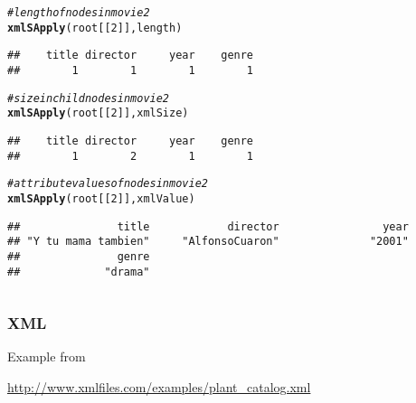 \documentclass[12pt]{beamer}\usepackage[]{graphicx}\usepackage[]{color}
\makeatletter
\newcommand{\hlnum}[1]{\textcolor[rgb]{0.686,0.059,0.569}{#1}}%
\newcommand{\hlcom}[1]{\textcolor[rgb]{0.678,0.584,0.686}{\textit{#1}}}%
\newcommand{\hlstd}[1]{\textcolor[rgb]{0.345,0.345,0.345}{#1}}%
\newcommand{\hlkwd}[1]{\textcolor[rgb]{0.737,0.353,0.396}{\textbf{#1}}}%
\newenvironment{kframe}{%
 \def\at@end@of@kframe{}%
 \ifinner\ifhmode%
  \def\at@end@of@kframe{\end{minipage}}%
  \begin{minipage}{\columnwidth}%
 \fi\fi%
 \def\FrameCommand##1{\hskip\@totalleftmargin \hskip-\fboxsep
 \colorbox{shadecolor}{##1}\hskip-\fboxsep
     \hskip-\linewidth \hskip-\@totalleftmargin \hskip\columnwidth}%
 \MakeFramed {\advance\hsize-\width
   \@totalleftmargin\z@ \linewidth\hsize
   \@setminipage}}%
 {\par\unskip\endMakeFramed%
 \at@end@of@kframe}
\newenvironment{knitrout}{}{} %
\makeatother
\begin{document}
\begin{frame}[fragile]
\begin{columns}[t]
\begin{column}{0.5\textwidth}
\begin{knitrout}\tiny
{}\color{fgcolor}\begin{kframe}
\begin{alltt}
\hlcom{# length of nodes in movie 2}
\hlkwd{xmlSApply}\hlstd{(root[[}\hlnum{2}\hlstd{]], length)}
\end{alltt}
\begin{verbatim}
##    title director     year    genre 
##        1        1        1        1
\end{verbatim}
\begin{alltt}
\hlcom{# size in child nodes in movie 2}
\hlkwd{xmlSApply}\hlstd{(root[[}\hlnum{2}\hlstd{]], xmlSize)}
\end{alltt}
\begin{verbatim}
##    title director     year    genre 
##        1        2        1        1
\end{verbatim}
\begin{alltt}
\hlcom{# attribute values of nodes in movie 2}
\hlkwd{xmlSApply}\hlstd{(root[[}\hlnum{2}\hlstd{]], xmlValue)}
\end{alltt}
\begin{verbatim}
##               title            director                year 
## "Y tu mama tambien"     "AlfonsoCuaron"              "2001" 
##               genre 
##             "drama"
\end{verbatim}
\end{kframe}
\end{knitrout}
\end{column}
\end{columns}

\end{frame}


\begin{frame}
\begin{center}
\Huge{}
\end{center}
\end{frame}


\begin{frame}
\frametitle{XML}

Example from 

\url{http://www.xmlfiles.com/examples/plant_catalog.xml}

\end{frame}
\end{document}
